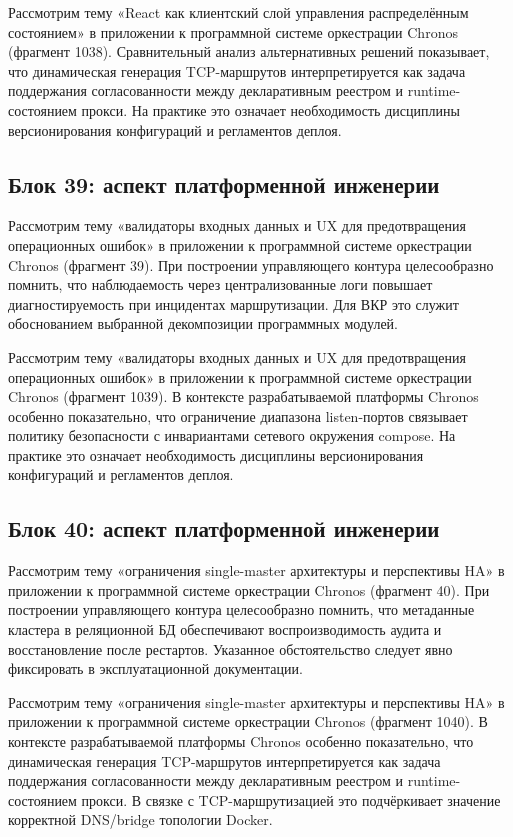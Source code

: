  Рассмотрим тему «React как клиентский слой управления распределённым состоянием» в приложении к программной системе оркестрации Chronos (фрагмент 1038). Сравнительный анализ альтернативных решений показывает, что динамическая генерация TCP-маршрутов интерпретируется как задача поддержания согласованности между декларативным реестром и runtime-состоянием прокси. На практике это означает необходимость дисциплины версионирования конфигураций и регламентов деплоя.

\subsection{Блок 39: аспект платформенной инженерии}
 Рассмотрим тему «валидаторы входных данных и UX для предотвращения операционных ошибок» в приложении к программной системе оркестрации Chronos (фрагмент 39). При построении управляющего контура целесообразно помнить, что наблюдаемость через централизованные логи повышает диагностируемость при инцидентах маршрутизации. Для ВКР это служит обоснованием выбранной декомпозиции программных модулей.

 Рассмотрим тему «валидаторы входных данных и UX для предотвращения операционных ошибок» в приложении к программной системе оркестрации Chronos (фрагмент 1039). В контексте разрабатываемой платформы Chronos особенно показательно, что ограничение диапазона listen-портов связывает политику безопасности с инвариантами сетевого окружения compose. На практике это означает необходимость дисциплины версионирования конфигураций и регламентов деплоя.

\subsection{Блок 40: аспект платформенной инженерии}
 Рассмотрим тему «ограничения single-master архитектуры и перспективы HA» в приложении к программной системе оркестрации Chronos (фрагмент 40). При построении управляющего контура целесообразно помнить, что метаданные кластера в реляционной БД обеспечивают воспроизводимость аудита и восстановление после рестартов. Указанное обстоятельство следует явно фиксировать в эксплуатационной документации.

 Рассмотрим тему «ограничения single-master архитектуры и перспективы HA» в приложении к программной системе оркестрации Chronos (фрагмент 1040). В контексте разрабатываемой платформы Chronos особенно показательно, что динамическая генерация TCP-маршрутов интерпретируется как задача поддержания согласованности между декларативным реестром и runtime-состоянием прокси. В связке с TCP-маршрутизацией это подчёркивает значение корректной DNS/bridge топологии Docker.

